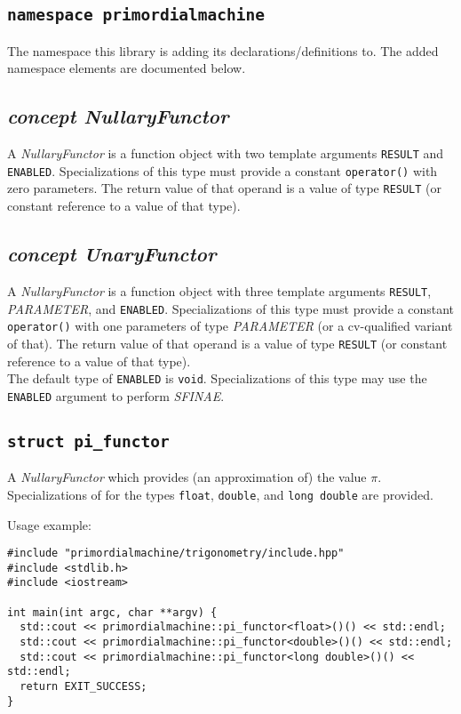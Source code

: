 \documentclass[oneside]{article}
\begin{document}
\subsection{\texttt{namespace primordialmachine}}
The namespace this library is adding its declarations/definitions to.
The added namespace elements are documented below.

\subsection{\textit{concept NullaryFunctor}}
A \textit{NullaryFunctor} is a function object with two template arguments \texttt{RESULT} and
\texttt{ENABLED}. Specializations of this type must provide a constant \verb+operator()+ with
zero parameters. The return value of that operand is a value of type \texttt{RESULT} (or constant
reference to a value of that type).\\

\subsection{\textit{concept UnaryFunctor}}
A \textit{NullaryFunctor} is a function object with three template arguments \texttt{RESULT},
\textit{PARAMETER}, and \texttt{ENABLED}. Specializations of this type must provide a constant
\verb+operator()+ with one parameters of type \textit{PARAMETER} (or a cv-qualified variant of
that). The return value of that operand is a value of type \texttt{RESULT} (or constant
reference to a value of that type).\\

\noindent{}The default type of \verb+ENABLED+ is \verb+void+. Specializations of this type may use
the \verb+ENABLED+ argument to perform \textit{SFINAE}.

\subsection{\texttt{struct pi\_functor}}
A \textit{NullaryFunctor} which provides (an approximation of) the value $\pi$.
Specializations of for the types \texttt{float}, \texttt{double}, and \texttt{long double} are provided.

\noindent{}Usage example:
\begin{verbatim}
#include "primordialmachine/trigonometry/include.hpp"
#include <stdlib.h>
#include <iostream>

int main(int argc, char **argv) {
  std::cout << primordialmachine::pi_functor<float>()() << std::endl;
  std::cout << primordialmachine::pi_functor<double>()() << std::endl;
  std::cout << primordialmachine::pi_functor<long double>()() << std::endl;  
  return EXIT_SUCCESS;
}
\end{verbatim}
\end{document}
